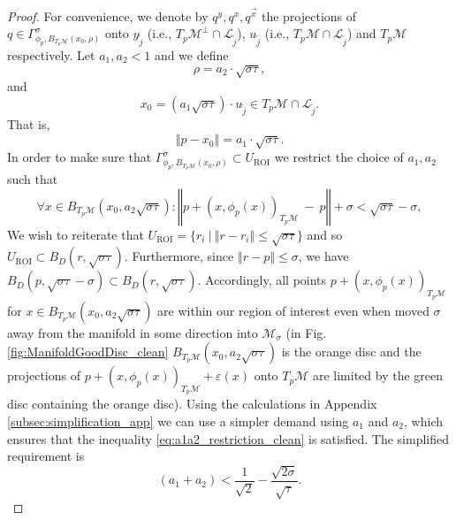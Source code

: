 \documentclass[12pt]{article}
\theoremstyle{remark}
\newcommand{\MM}{\mathcal{M}}
\newcommand{\LL}{\mathcal{L}}
\newcommand{\eps}{\varepsilon}
\newcommand{\norm}[1]{\left\Vert #1 \right\Vert}
\begin{document}
\begin{proof}
For convenience, we denote by $q^y, q^x, q^{\vec x}$ the projections of $q\in \Gamma_{\phi_p, B_{T_p\MM}(x_0, \rho)}^\sigma$ onto $y_{\tilde j}$ (i.e., $T_p\MM^\perp\cap \LL_{\tilde j}$), $u_{\tilde j}$ (i.e., $T_p\MM\cap \LL_{\tilde j}$) and $T_p\MM$ respectively.
Let $a_1, a_2<1$ and we define 
$$\rho = a_2 \cdot\sqrt{\sigma\tau},$$
and 
$$x_0 = (a_1\sqrt{\sigma\tau})\cdot u_{\tilde j}\in T_p\MM \cap \LL_{\tilde j}.$$
That is, 
\[
\norm{p - x_0} = a_1 \cdot \sqrt{\sigma\tau}
.\]
In order to make sure that $\Gamma^\sigma_{\phi_p, B_{T_p\MM}(x_0, \rho)}\subset U_{\textrm{ROI}}$ we restrict the choice of $a_1, a_2$ such that
\begin{equation}\label{eq:a1a2_restriction_clean}
    \forall x\in B_{T_p\MM}(x_0, a_2\sqrt{\sigma\tau}): \norm{p+(x,\phi_p(x))_{T_p\MM} ~-~ p}
    + \sigma < \sqrt{\sigma\tau} - \sigma
,\end{equation}
We wish to reiterate that $U_\textrm{ROI} = \{r_i ~|~ \norm{r - r_i}\leq \sqrt{\sigma \tau}\}$ and so $U_\textrm{ROI}\subset B_D(r, \sqrt{\sigma\tau})$.
Furthermore, since $\norm{r - p}\leq \sigma$, we have $B_D(p, \sqrt{\sigma\tau} - \sigma)\subset  B_D(r, \sqrt{\sigma\tau})$.
Accordingly, all points $p+(x, \phi_p(x))_{T_p\MM}$ for  $x\in B_{T_p\MM}(x_0, a_2 \sqrt{\sigma\tau})$ are within our region of interest even when moved $\sigma$ away from the manifold in some direction into $\MM_\sigma$ (in Fig. \ref{fig:ManifoldGoodDisc_clean}  $B_{T_p\MM}(x_0, a_2\sqrt{\sigma\tau})$ is the orange disc and the projections of $p+(x, \phi_p(x))_{T_p\MM} + \eps(x)$ onto $T_p\MM$ are limited by the green disc containing the orange disc).
Using the calculations in Appendix \ref{subsec:simplification_app} we can use a simpler demand using $a_1$ and $a_2$, which ensures that the inequality \eqref{eq:a1a2_restriction_clean} is satisfied. The simplified requirement is
\begin{equation}\label{eq:a1a2_simplification_clean}
    (a_1+a_2)<\frac{1}{\sqrt{2}} -\frac{\sqrt{2\sigma}}{\sqrt{\tau}}
.\end{equation}


\end{proof}
\end{document}
